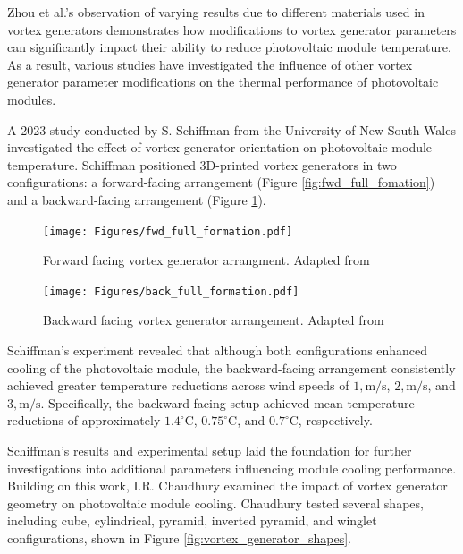 Zhou et al.'s observation of varying results due to different materials used in vortex generators demonstrates how modifications to vortex generator parameters can significantly impact their ability to reduce photovoltaic module temperature. \cite{Zhou2024Long-termCooling} As a result, various studies have investigated the influence of other vortex generator parameter modifications on the thermal performance of photovoltaic modules.

A 2023 study conducted by S. Schiffman from the University of New South Wales investigated the effect of vortex generator orientation on photovoltaic module temperature. Schiffman positioned 3D-printed vortex generators in two configurations: a forward-facing arrangement (Figure \ref{fig:fwd_full_fomation}) and a backward-facing arrangement (Figure \ref{fig:back_full_formation}). \cite{Schiffmann2023AnConditions}

\begin{figure}[H]
    \centering
    \begin{minipage}[b]{0.47\linewidth}
        \centering
        \texttt{[image: Figures/fwd\_full\_formation.pdf]}
        \caption{Forward facing vortex generator arrangment. Adapted from \cite{Schiffmann2023AnConditions}}
        \label{fig:fwd_full_fomation}
    \end{minipage}
    \hfill
    \begin{minipage}[b]{0.47\linewidth}
        \centering
        \texttt{[image: Figures/back\_full\_formation.pdf]}
        \caption{Backward facing vortex generator arrangement. Adapted from \cite{Schiffmann2023AnConditions}}
        \label{fig:back_full_formation}
    \end{minipage}
\end{figure}

Schiffman's experiment revealed that although both configurations enhanced cooling of the photovoltaic module, the backward-facing arrangement consistently achieved greater temperature reductions across wind speeds of $1,\text{m/s}$, $2,\text{m/s}$, and $3,\text{m/s}$. Specifically, the backward-facing setup achieved mean temperature reductions of approximately $1.4^\circ\text{C}$, $0.75^\circ\text{C}$, and $0.7^\circ\text{C}$, respectively. \cite{Schiffmann2023AnConditions}

Schiffman's results and experimental setup laid the foundation for further investigations into additional parameters influencing module cooling performance. Building on this work, I.R. Chaudhury examined the impact of vortex generator geometry on photovoltaic module cooling. Chaudhury tested several shapes, including cube, cylindrical, pyramid, inverted pyramid, and winglet configurations, shown in Figure \ref{fig:vortex_generator_shapes}. \cite{Chaudhury2024TheConvection}

